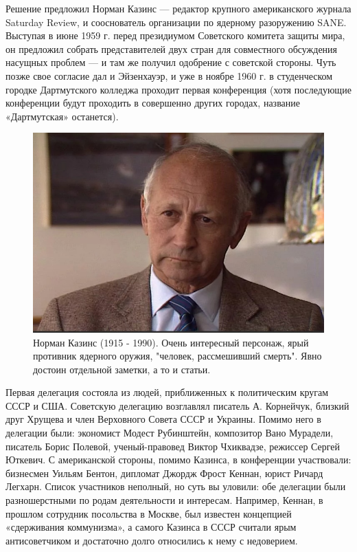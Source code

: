 Решение предложил Норман Казинс — редактор крупного американского журнала Saturday Review, и сооснователь организации по ядерному разоружению SANE. Выступая в июне 1959 г. перед президиумом Советского комитета защиты мира, он предложил собрать представителей двух стран для совместного обсуждения насущных проблем — и там же получил одобрение с советской стороны. Чуть позже свое согласие дал и Эйзенхауэр, и уже в ноябре 1960 г. в студенческом городке Дартмутского колледжа проходит первая конференция (хотя последующие конференции будут проходить в совершенно других городах, название «Дартмутская» останется).
\begin{figure}[h!tb] 
	\centering\includegraphics[scale=0.5]{Dartmud/pqA6Euw_ISE.jpg}
	\caption{Норман Казинс (1915 - 1990). Очень интересный персонаж, ярый противник ядерного оружия, "человек, рассмешивший смерть". Явно достоин отдельной заметки, а то и статьи. }%
\end{figure}
Первая делегация состояла из людей, приближенных к политическим кругам СССР и США. Советскую делегацию возглавлял писатель А. Корнейчук, близкий друг Хрущева и член Верховного Совета СССР и Украины. Помимо него в делегации были: экономист Модест Рубинштейн, композитор Вано Мурадели, писатель Борис Полевой, ученый-правовед Виктор Чхиквадзе, режиссер Сергей Юткевич. С американской стороны, помимо Казинса, в конференции участвовали: бизнесмен Уильям Бентон, дипломат Джордж Фрост Кеннан, юрист Ричард Легхарн. Список участников неполный, но суть вы уловили: обе делегации были разношерстными по родам деятельности и интересам. Например, Кеннан, в прошлом сотрудник посольства в Москве, был известен концепцией «сдерживания коммунизма», а самого Казинса в СССР считали ярым антисоветчиком и достаточно долго относились к нему с недоверием.


